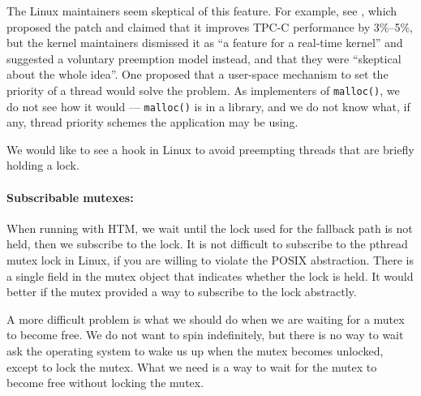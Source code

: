 \documentclass[pldi]{sigplanconf-pldi15}
\newcommand{\code}[1]{\texttt{#1}}
\begin{document}
The Linux maintainers seem skeptical of this feature.  For example,
see \cite{Aziz14}, which proposed the patch and claimed that it
improves TPC-C performance by 3\%--5\%, but the kernel maintainers
dismissed it as ``a feature for a real-time kernel'' and suggested a
voluntary preemption model instead, and that they were ``skeptical
about the whole idea''.  One proposed \cite{Oboguev14a, Oboguev14b}
that a user-space mechanism to set the priority of a thread would solve
the problem.  As implementers of \code{malloc()}, we do not see how it
would --- \code{malloc()} is in a library, and we do not know what, if
any, thread priority schemes the application may be using.

We would like to see a hook in Linux to avoid preempting threads that
are briefly holding a lock.

{\paragraph{Subscribable mutexes:}} When running with HTM, we wait
until the lock used for the fallback path is not held, then we
subscribe to the lock.  It is not difficult to subscribe to the
pthread mutex lock in Linux, if you are willing to violate the POSIX
abstraction.  There is a single field in the mutex object that
indicates whether the lock is held.  It would better if the mutex
provided a way to subscribe to the lock abstractly.

A more difficult problem is what we should do when we are waiting for
a mutex to become free.  We do not want to spin indefinitely, but
there is no way to wait ask the operating system to wake us up when
the mutex becomes unlocked, except to lock the mutex.  What we need is
a way to wait for the mutex to become free without locking the mutex. 


\end{document}
